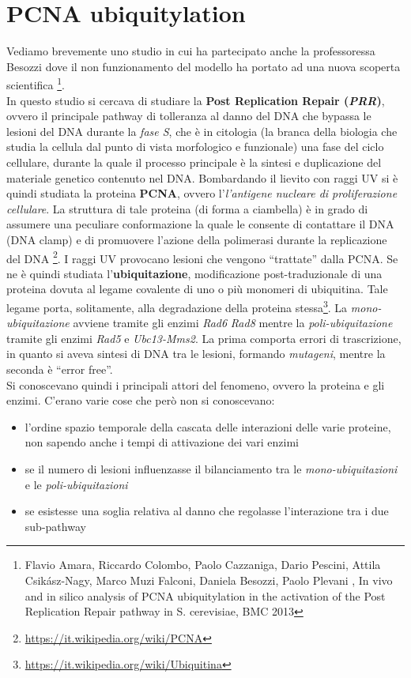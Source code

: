 \documentclass[a4paper,12pt, oneside]{book}
\begin{document}
\section{PCNA ubiquitylation}
Vediamo brevemente uno studio in cui ha partecipato anche la professoressa
Besozzi dove il non funzionamento del modello ha portato ad una nuova scoperta
scientifica \footnote{
  Flavio Amara, Riccardo Colombo, Paolo Cazzaniga, Dario Pescini, Attila
  Csikász-Nagy, Marco Muzi Falconi, Daniela Besozzi, Paolo Plevani , In vivo and
  in silico analysis of PCNA ubiquitylation in the activation of the 
  Post Replication Repair pathway in S. cerevisiae, BMC 2013 }.\\
In questo studio si cercava di studiare la \textbf{Post Replication Repair
  (\textit{PRR})}, ovvero il principale pathway di tolleranza al danno del DNA
che bypassa le lesioni del DNA durante la \textit{fase S}, che è in citologia
(la branca della biologia che studia la cellula dal punto di vista morfologico e
funzionale) una fase del ciclo cellulare, durante la quale il processo
principale è la sintesi e duplicazione del materiale genetico contenuto nel
DNA. Bombardando il lievito con raggi UV si è quindi studiata la proteina
\textbf{PCNA}, ovvero l'\textit{l'antigene nucleare di proliferazione
  cellulare}. La struttura di tale proteina (di forma a ciambella) è in grado di
assumere una peculiare conformazione la quale le consente di contattare il DNA
(DNA clamp) e di promuovere l'azione della polimerasi durante la replicazione
del DNA \footnote{\url{https://it.wikipedia.org/wiki/PCNA}}. I raggi UV
provocano lesioni che vengono ``trattate'' dalla PCNA. Se ne è quindi
studiata l'\textbf{ubiquitazione}, modificazione post-traduzionale di una
proteina dovuta al legame covalente di uno o più monomeri di ubiquitina. Tale
legame porta, solitamente, alla degradazione della proteina
stessa\footnote{\url{https://it.wikipedia.org/wiki/Ubiquitina}}. La
\textit{mono-ubiquitazione} avviene tramite gli enzimi \textit{Rad6}
\textit{Rad8} mentre la \textit{poli-ubiquitazione} tramite gli enzimi
\textit{Rad5} e \textit{Ubc13-Mms2}. La prima comporta errori di trascrizione,
in quanto si aveva sintesi di DNA tra le lesioni, formando \textit{mutageni},
mentre la seconda è ``error free''.\\
Si conoscevano quindi i principali attori del fenomeno, ovvero la proteina e gli
enzimi. C'erano varie cose che però non si conoscevano:
\begin{itemize}
  \item l'ordine spazio temporale della cascata delle interazioni delle varie
  proteine, non sapendo anche i tempi di attivazione dei vari enzimi
  \item se il numero di lesioni influenzasse il bilanciamento tra le
  \textit{mono-ubiquitazioni} e le \textit{poli-ubiquitazioni}
  \item se esistesse una soglia relativa al danno che regolasse l'interazione
  tra i due sub-pathway
\end{itemize}
\end{document}
